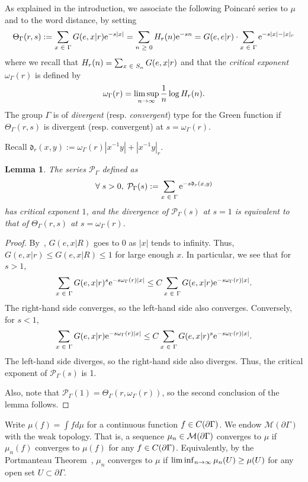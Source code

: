 \documentclass[10pt]{amsart}
\newtheorem{lemm}[theo]{Lemma}\newtheorem{prop}[theo]{Proposition}\newtheorem{coro}[theo]{Corollary}\newtheorem{conj}[theo]{Conjecture}
\theoremstyle{definition}\newtheorem{defi}[theo]{Definition}\newtheorem{rema}[theo]{Remark}\newtheorem{exam}[theo]{Example}\newtheorem{exem}[theo]{Example}\newtheorem{nota}[theo]{Notation}
\newcommand{\pG}{\partial{\Gamma}}
\newcommand{\rme}{\mathrm{e}}
\newcommand{\fkd}{\mathfrak{d}}
\newcommand{\clM}{\mathcal{M}}
\newcommand{\clP}{\mathcal{P}}
\let\oldin\in
\renewcommand{\in}{\mathchoice{\oldin}{\oldin}{\,\oldin\,}{\,\oldin\,}}
\let\oldge\ge
\renewcommand{\ge}{\mathchoice{\oldge}{\oldge}{\,\oldge\,}{\,\oldge\,}}
\renewcommand*{\to}{\mathchoice{\longrightarrow}{\rightarrow}{\rightarrow}{\rightarrow}}
\let\oldforall\forall
\renewcommand*{\forall}{\mathrel{\oldforall}}
\begin{document}
As explained in the introduction, we associate the following Poincaré series to $\mu$ and to the word distance, by setting
\begin{align*}
\Theta_\Gamma({r, s}) := \sum_{x\in \Gamma} G(e, x |r) \rme^{-s|x|} = \sum_{n\ge 0} H_r(n) \rme^{-sn} =G(e,e|r)\cdot \sum_{x\in \Gamma} \rme^{-s|x|-|x|_r}
\end{align*}
where we recall that $H_r(n)=\sum_{x\in S_n} G(e,x|r)$ and that the
\emph{critical exponent} $\omega_\Gamma(r)$ is defined by
\[
\omega_\Gamma(r) = \limsup\limits_{n \to \infty} \frac{1}{n} \log H_r(n).
\]
The group $\Gamma$ is of \emph{divergent} (resp.
\emph{convergent}) type {for the Green function} if $\Theta_\Gamma({r,s})$ is divergent (resp. convergent) at $s=\omega_\Gamma(r)$.

Recall $\fkd_r(x,y):=\omega_\Gamma(r)|x^{-1}y| +|x^{-1}y|_r$.
\begin{lemm}\label{NewPoincareSeries}
The series $\clP_\Gamma$ defined as
\[
\forall s>0,\;\clP_{\Gamma}(s):=\sum\limits_{x \in \Gamma} \rme^{- s \fkd_r(x,y)}
\]
has critical exponent $1$, and the divergence of $\clP_{\Gamma}(s)$ at $s=1$ is equivalent to that of $\Theta_\Gamma({r,s})$ at $s=\omega_\Gamma(r)$.
\end{lemm}

\begin{proof}
By~\cite[Lemma~2.1]{GouezelLalley}, $G(e,x|R)$ goes to 0 as $|x|$ tends to infinity. Thus, $G(e,x|r)\leq G(e,x|R)\leq 1$ for large enough $x$. In particular, we see that for $s> 1$,
\[
\sum_{x\in \Gamma}G(e,x|r)^s\rme^{-s\omega_\Gamma(r) |x|}\leq C \sum_{x\in \Gamma}G(e,x|r)\rme^{-s\omega_\Gamma(r) |x|}.
\]
The right-hand side converges, so the left-hand side also converges. Conversely, for $s<1$,
\[
\sum_{x\in \Gamma}G(e,x|r)\rme^{-s\omega_\Gamma(r) |x|}\leq C \sum_{x\in \Gamma}G(e,x|r)^s\rme^{-s\omega_\Gamma(r) |x|}.
\]
The left-hand side diverges, so the right-hand side also diverges. Thus, the critical exponent of $\clP_\Gamma(s)$ is 1.

Also, note that $\clP_\Gamma(1)=\Theta_\Gamma(r,\omega_\Gamma(r))$, so the second conclusion of the lemma follows.
\end{proof}

Write $\mu(f) = \int f d\mu$ for a continuous function $f \in C(\pG)$. We endow $\clM(\pG)$ with the weak topology. That is, a sequence $\mu_n \in \clM(\pG)$ converges to $\mu$ if $\mu_n(f) $ converges to $ \mu(f)$ for any $f \in C(\pG)$. Equivalently, by the Portmanteau Theorem~\cite[Theorem~2.1]{Bill99}, $\mu_n$ converges to $\mu$ if $\liminf_{n \to \infty}\mu_n(U) \ge \mu(U)$ for any open set $U \subset \pG$.
\end{document}

